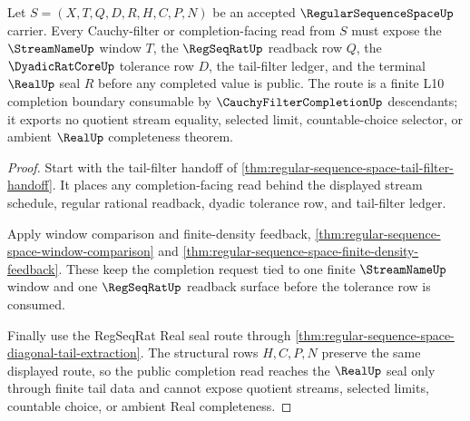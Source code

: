 \begin{theorem}
\label{thm:regular-sequence-space-cauchy-filter-completion-route}
Let $S=(X,T,Q,D,R,H,C,P,N)$ be an accepted $\RegularSequenceSpaceUp$ carrier. Every Cauchy-filter or completion-facing read from $S$ must expose the $\StreamNameUp$ window $T$, the $\RegSeqRatUp$ readback row $Q$, the $\DyadicRatCoreUp$ tolerance row $D$, the tail-filter ledger, and the terminal $\RealUp$ seal $R$ before any completed value is public. The route is a finite L10 completion boundary consumable by $\CauchyFilterCompletionUp$ descendants; it exports no quotient stream equality, selected limit, countable-choice selector, or ambient $\RealUp$ completeness theorem.
\end{theorem}
\begin{proof}
Start with the tail-filter handoff of \autoref{thm:regular-sequence-space-tail-filter-handoff}. It places any completion-facing read behind the displayed stream schedule, regular rational readback, dyadic tolerance row, and tail-filter ledger.

Apply window comparison and finite-density feedback, \autoref{thm:regular-sequence-space-window-comparison} and \autoref{thm:regular-sequence-space-finite-density-feedback}. These keep the completion request tied to one finite $\StreamNameUp$ window and one $\RegSeqRatUp$ readback surface before the tolerance row is consumed.

Finally use the RegSeqRat Real seal route through \autoref{thm:regular-sequence-space-diagonal-tail-extraction}. The structural rows $H,C,P,N$ preserve the same displayed route, so the public completion read reaches the $\RealUp$ seal only through finite tail data and cannot expose quotient streams, selected limits, countable choice, or ambient Real completeness.
\end{proof}

